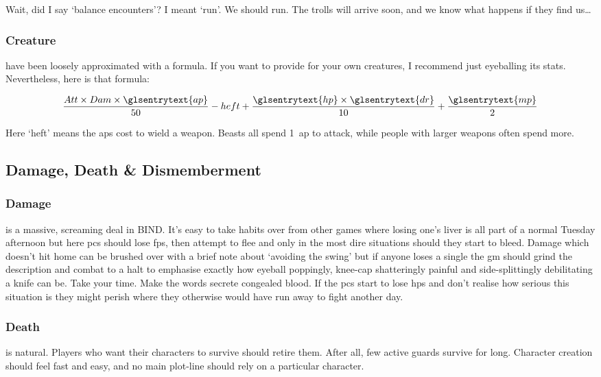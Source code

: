 \begin{multicols}{2}
Wait, did I say `balance encounters'?
I meant `run'.
We should run.
The trolls will arrive soon, and we know what happens if they find us\ldots

\subsubsection{Creature }
have been loosely approximated with a formula.
If you want to provide  for your own creatures, I recommend just eyeballing its stats.
Nevertheless, here is that formula:

\begin{align*}
\frac{Att \times Dam \times \glsentrytext{ap}}{50}
-
heft
+
\frac{\glsentrytext{hp} \times \glsentrytext{dr}}{10}
+
\frac{\glsentrytext{mp}}{2}
\end{align*}

\noindent
Here `heft' means the \glspl{ap} cost to wield a weapon.
Beasts all spend 1~\gls{ap} to attack, while people with larger weapons often spend more.

\subsection{Damage, Death \& Dismemberment}

\subsubsection{Damage}
is a massive, screaming deal in BIND.
It's easy to take habits over from other games where losing one's liver is all part of a normal Tuesday afternoon but here \glspl{pc} should lose \glspl{fp}, then attempt to flee and only in the most dire situations should they start to bleed.
Damage which doesn't hit home can be brushed over with a brief note about `avoiding the swing' but if anyone loses a single  the \gls{gm} should grind the description and combat to a halt to emphasise exactly how eyeball poppingly, knee-cap shatteringly painful and side-splittingly debilitating a knife can be.
Take your time.
Make the words secrete congealed blood.
If the \glspl{pc} start to lose \glspl{hp} and don't realise how serious this situation is they might perish where they otherwise would have run away to fight another day.

\subsubsection{Death}
\label{pcdeath}
is natural.
Players who want their characters to survive should retire them.
After all, few active \glspl{guard} survive for long.
Character creation should feel fast and easy, and no main plot-line should rely on a particular character.


\end{multicols}
